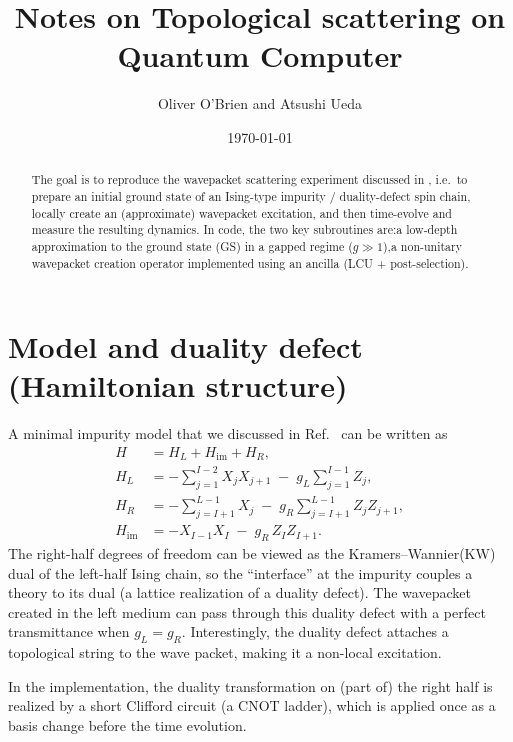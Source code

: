 \documentclass[11pt]{article}
\title{Notes on Topological scattering on Quantum Computer}
\author{Oliver O'Brien and Atsushi Ueda}
\date{\today}
\begin{document}
\maketitle

\begin{abstract}
    The goal is to reproduce the wavepacket scattering experiment discussed in
\cite{ueda2025}, i.e.\ to prepare an initial ground state of an Ising-type
impurity / duality-defect spin chain, locally create an (approximate) wavepacket
excitation, and then time-evolve and measure the resulting dynamics. In code, the two key subroutines are:a low-depth approximation to the ground state (GS) in a gapped regime ($g\gg 1$),a non-unitary wavepacket creation operator implemented using an ancilla (LCU + post-selection).
\end{abstract}

\section{Model and duality defect (Hamiltonian structure)}
A minimal impurity model that we discussed in Ref.~\cite{ueda2025} can be written as
\begin{align}
H &= H_L + H_{\mathrm{im}} + H_R, \\
H_L &= -\sum_{j=1}^{I-2} X_jX_{j+1} \;-\; g_L\sum_{j=1}^{I-1} Z_j, \\
H_R &= -\sum_{j=I+1}^{L-1} X_j \;-\; g_R\sum_{j=I+1}^{L-1} Z_jZ_{j+1}, \\
H_{\mathrm{im}} &= -X_{I-1}X_{I} \;-\; g_R\, Z_{I}Z_{I+1}.
\end{align}
The right-half degrees of freedom can be viewed as the Kramers--Wannier(KW) dual of
the left-half Ising chain, so the ``interface'' at the impurity couples a theory
to its dual (a lattice realization of a duality defect). The wavepacket created in the left medium can pass through this duality defect with a perfect transmittance when $g_L = g_R$. Interestingly, the duality defect attaches a topological string to the wave packet, making it a non-local excitation. 

In the implementation, the duality transformation on (part of) the right half is
realized by a short Clifford circuit (a CNOT ladder), which is applied once as a
basis change before the time evolution.
\end{document}
